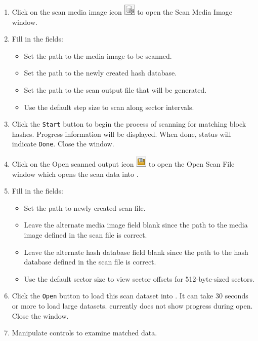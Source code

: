 \documentclass[11pt,fleqn]{article} %
\begin{document}
\begin{enumerate}
\item Click on the scan media image icon
\includegraphics[scale=.4]{screenshots/scan_media_image_icon}
to open the \sscope Scan Media Image window.
\item Fill in the fields:
  \begin{itemize}
  \item Set the path to the media image to be scanned.
  \item Set the path to the newly created hash database.
  \item Set the path to the scan output file that will be generated.
  \item Use the default step size to scan along sector intervals.
  \end{itemize}
\item Click the \verb+Start+ button to begin the process of scanning for matching block hashes. Progress information will be displayed. When done, status will indicate \verb+Done+. Close the window.
\item Click on the Open scanned output icon
\includegraphics[scale=.4]{screenshots/open_scanned_output_icon}
to open the Open Scan File window which opens the scan data into \sscope.
\item Fill in the fields:
  \begin{itemize}
  \item Set the path to newly created scan file.
  \item Leave the alternate media image field blank since the path to the media image defined in the scan file is correct.
  \item Leave the alternate hash database field blank since the path to the hash database defined in the scan file is correct.
  \item Use the default sector size to view sector offsets for 512-byte-sized sectors.
  \end{itemize}
\item Click the \verb+Open+ button to load this scan dataset into \sscope. It can take 30 seconds or more to load large datasets. \sscope currently does not show progress during open. Close the window.
\item Manipulate \sscope controls to examine matched data.
\end{enumerate}
\end{document}
